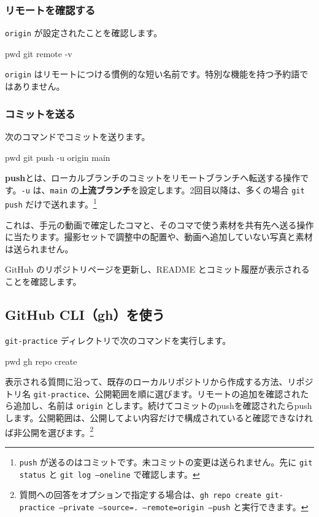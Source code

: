 \documentclass[a4paper,11pt]{jlreq}
\newcommand{\cmd}[1]{\texttt{#1}}
\newcommand{\term}[1]{\textbf{#1}}
\begin{document}
\subsubsection{リモートを確認する}

\cmd{origin} が設定されたことを確認します。

\begin{codeblock}
pwd
git remote -v
\end{codeblock}

\cmd{origin} はリモートにつける慣例的な短い名前です。特別な機能を持つ予約語ではありません。

\subsubsection{コミットを送る}

次のコマンドでコミットを送ります。

\begin{codeblock}
pwd
git push -u origin main
\end{codeblock}

\term{push}とは、ローカルブランチのコミットをリモートブランチへ転送する操作です。\cmd{-u} は、\cmd{main} の\term{上流ブランチ}を設定します。2回目以降は、多くの場合 \cmd{git push} だけで送れます。\footnote{\cmd{push} が送るのはコミットです。未コミットの変更は送られません。先に \cmd{git status} と \cmd{git log --oneline} で確認します。}

これは、手元の動画で確定したコマと、そのコマで使う素材を共有先へ送る操作に当たります。撮影セットで調整中の配置や、動画へ追加していない写真と素材は送られません。

GitHub のリポジトリページを更新し、README とコミット履歴が表示されることを確認します。

\subsection{GitHub CLI（gh）を使う}

\cmd{git-practice} ディレクトリで次のコマンドを実行します。

\begin{codeblock}
pwd
gh repo create
\end{codeblock}

表示される質問に沿って、既存のローカルリポジトリから作成する方法、リポジトリ名 \cmd{git-practice}、公開範囲を順に選びます。リモートの追加を確認されたら追加し、名前は \cmd{origin} とします。続けてコミットのpushを確認されたらpushします。公開範囲は、公開してよい内容だけで構成されていると確認できなければ非公開を選びます\autocite{gh-repo-create}。\footnote{質問への回答をオプションで指定する場合は、\cmd{gh repo create git-practice --private --source=. --remote=origin --push} と実行できます。}
\end{document}
